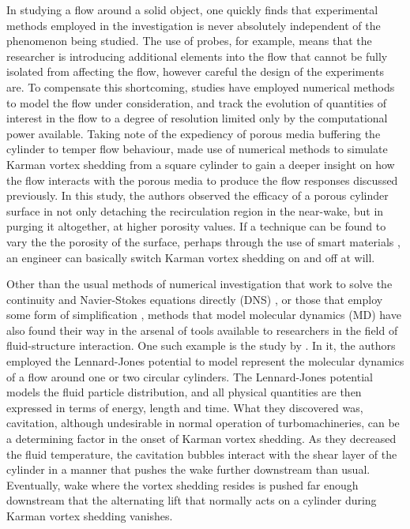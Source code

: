 \documentclass[oneside]{utmthesis}
\begin{document}
In studying a flow around a solid object, one quickly finds that experimental methods employed in the investigation is never absolutely independent of the phenomenon being studied. The use of probes, for example, means that the researcher is introducing additional elements into the flow that cannot be fully isolated from affecting the flow, however careful the design of the experiments are. To compensate this shortcoming, studies have employed numerical methods to model the flow under consideration, and track the evolution of quantities of interest in the flow to a degree of resolution limited only by the computational power available. Taking note of the expediency of porous media buffering the cylinder to temper flow behaviour, \citet{Ledda2018} made use of numerical methods to simulate Karman vortex shedding from a square cylinder to gain a deeper insight on how the flow interacts with the porous media to produce the flow responses discussed previously. In this study, the authors observed the efficacy of a porous cylinder surface in not only detaching the recirculation region in the near-wake, but in purging it altogether, at higher porosity values. If a technique can be found to vary the the porosity of the surface, perhaps through the use of smart materials \citep{Arsh2020}, an engineer can basically switch Karman vortex shedding on and off at will.

Other than the usual methods of numerical investigation that work to solve the continuity and Navier-Stokes equations directly (DNS) \citep{AlvesPortela2020}, or those that employ some form of simplification \citep{Shao2016}, methods that model molecular dynamics (MD) have also found their way in the arsenal of tools available to researchers in the field of fluid-structure interaction. One such example is the study by \citet{Asano2020}. In it, the authors employed the Lennard-Jones potential to model represent the molecular dynamics of a flow around one or two circular cylinders. The Lennard-Jones potential models the fluid particle distribution, and all physical quantities are then expressed in terms of energy, length and time. What they discovered was, cavitation, although undesirable in normal operation of turbomachineries, can be a determining factor in the onset of Karman vortex shedding. As they decreased the fluid temperature, the cavitation bubbles interact with the shear layer of the cylinder in a manner that pushes the wake further downstream than usual. Eventually, wake where the vortex shedding resides is pushed far enough downstream that the alternating lift that normally acts on a cylinder during Karman vortex shedding vanishes.
\end{document}

